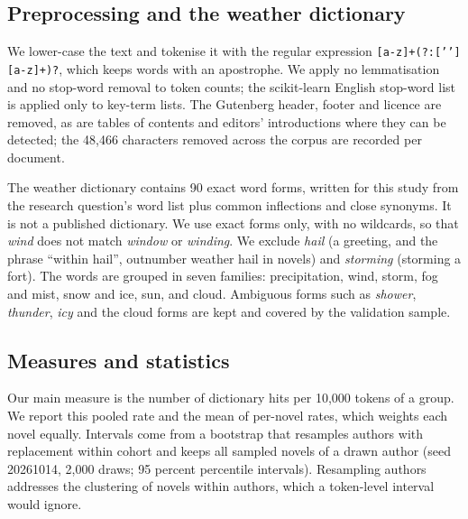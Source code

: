 \documentclass[11pt]{article}
\begin{document}


\subsection{Preprocessing and the weather dictionary}

We lower-case the text and tokenise it with the regular expression \texttt{[a-z]+(?:['’][a-z]+)?}, which keeps words with an apostrophe. We apply no lemmatisation and no stop-word removal to token counts; the scikit-learn English stop-word list is applied only to key-term lists. The Gutenberg header, footer and licence are removed, as are tables of contents and editors' introductions where they can be detected; the 48,466 characters removed across the corpus are recorded per document.

The weather dictionary contains 90 exact word forms, written for this study from the research question's word list plus common inflections and close synonyms. It is not a published dictionary. We use exact forms only, with no wildcards, so that \emph{wind} does not match \emph{window} or \emph{winding}. We exclude \emph{hail} (a greeting, and the phrase ``within hail'', outnumber weather hail in novels) and \emph{storming} (storming a fort). The words are grouped in seven families: precipitation, wind, storm, fog and mist, snow and ice, sun, and cloud. Ambiguous forms such as \emph{shower}, \emph{thunder}, \emph{icy} and the cloud forms are kept and covered by the validation sample.

\subsection{Measures and statistics}

Our main measure is the number of dictionary hits per 10,000 tokens of a group. We report this pooled rate and the mean of per-novel rates, which weights each novel equally. Intervals come from a bootstrap that resamples authors with replacement within cohort and keeps all sampled novels of a drawn author (seed 20261014, 2,000 draws; 95 percent percentile intervals). Resampling authors addresses the clustering of novels within authors, which a token-level interval would ignore.
\end{document}
